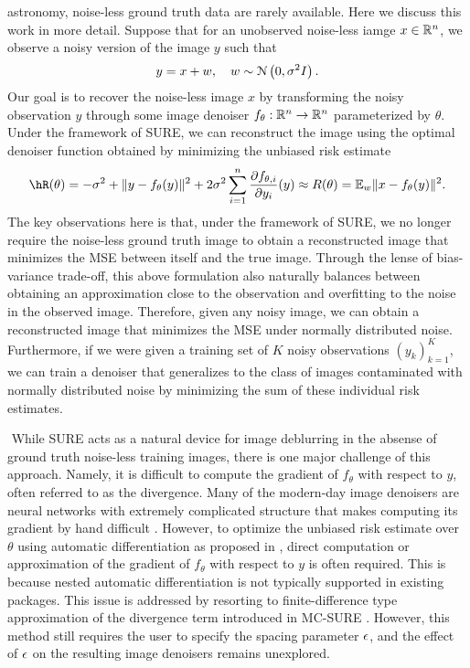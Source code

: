 astronomy, noise-less ground truth data are rarely available. Here we discuss this work in more detail. Suppose that for an unobserved noise-less iamge $x\in\mathbb{R}^n$, we observe a noisy version of the image $y$ such that
\[
y = x + w, \quad w\sim\mathcal{N}\left(0,\sigma^2I\right).
\]
Our goal is to recover the noise-less image $x$ by transforming the noisy observation $y$ through some image denoiser $f_\theta:\mathbb{R}^n\to\mathbb{R}^n$ parameterized by $\theta$. Under the framework of SURE, we can reconstruct the image using the optimal denoiser function obtained by minimizing the unbiased risk estimate
\[
\hR(\theta) = - \sigma^2 + \|y - f_\theta(y)\|^2 + 2\sigma^2\sum_{i=1}^n \frac{\partial f_{\theta,i}}{\partial y_i}(y) \approx R(\theta) = \EE_w \| x - f_\theta(y) \|^2.
\]
The key observations here is that, under the framework of SURE, we no longer require the noise-less ground truth image to obtain a reconstructed image that minimizes the MSE between itself and the true image. Through the lense of bias-variance trade-off, this above formulation also naturally balances between obtaining an approximation close to the observation and overfitting to the noise in the observed image. Therefore, given any noisy image, we can obtain a reconstructed image that minimizes the MSE under normally distributed noise. Furthermore, if we were given a training set of $K$ noisy observations $(y_k)_{k=1}^K$, we can train a denoiser that generalizes to the class of images contaminated with normally distributed noise by minimizing the sum of these individual risk estimates.

$ $\newline
While SURE acts as a natural device for image deblurring in the absense of ground truth noise-less training images, there is one major challenge of this approach. Namely, it is difficult to compute the gradient of $f_\theta$ with respect to $y$, often referred to as the divergence. Many of the modern-day image denoisers are neural networks with extremely complicated structure that makes computing its gradient by hand difficult \citep{zhang2017beyond,yang2017high,dong2014learning}. However, to optimize the unbiased risk estimate over $\theta$ using automatic differentiation as proposed in \citet{metzler2018unsupervised}, direct computation or approximation of the gradient of $f_\theta$ with respect to $y$ is often required. This is because nested automatic differentiation is not typically supported in existing packages. This issue is addressed by resorting to finite-difference type approximation of the divergence term introduced in MC-SURE \citep{ramani2008monte}. However, this method still requires the user to specify the spacing parameter $\epsilon$, and the effect of $\epsilon$ on the resulting image denoisers remains unexplored.








